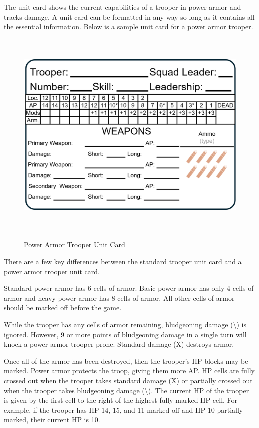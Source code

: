 The unit card shows the current capabilities of a trooper in power armor and tracks damage.
A unit card can be formatted in any way so long as it contains all the essential information.
Below is a sample unit card for a power armor trooper.

\begin{figure}[!h]
  \centering
  \includegraphics[alt='Sample Power Armor Trooper', width=5.63in, height=4in]{img/PowerArmorTrooper.png}
  \caption*{Power Armor Trooper Unit Card}
\end{figure}

There are a few key differences between the standard trooper unit card and a power armor trooper unit card.

Standard power armor has 6 cells of armor.
Basic power armor has only 4 cells of armor and heavy power armor has 8 cells of armor.
All other cells of armor should be marked off before the game.

While the trooper has any cells of armor remaining, bludgeoning damage (\textbackslash) is ignored.
However, 9 or more points of bludgeoning damage in a single turn will knock a power armor trooper prone.
Standard damage (X) destroys armor.

Once all of the armor has been destroyed, then the trooper's HP blocks may be marked.
Power armor protects the troop, giving them more AP.
HP cells are fully crossed out when the trooper takes standard damage (X) or partially crossed out when the trooper takes bludgeoning damage (\textbackslash).
The current HP of the trooper is given by the first cell to the right of the highest fully marked HP cell.
For example, if the trooper has HP 14, 15, and 11 marked off and HP 10 partially marked, their current HP is 10.

